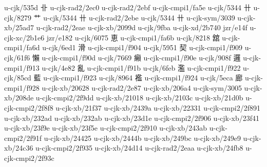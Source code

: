 \begin{multicols}{2}
u-cjk/535d	{\cjk{}卝}	u-cjk-rad2/2ec0	{} 
u-cjk-rad2/2ebf	{	}u-cjk-cmpi1/fa5e	{} 
u-cjk/5344	{\cjk{}卄}	u-cjk/8279	{\cjk{}艹} 
u-cjk/5344	{\cjk{}卄}	u-cjk-rad2/2ebe	{} 
u-cjk/5344	{\cjk{}卄}	u-cjk-sym/3039	{} 
u-cjk-xb/25ad7	{\cjk{}}	u-cjk-rad2/2eae	{} 
u-cjk-xb/2099d	{	}u-cjk/9fba	{\cjk{}} 
u-cjk-xd/2b740	{	}jzr/e14f	{} 
u-cjk-xc/2b1e6	{	}jzr/e182	{} 
u-cjk/6075	{\cjk{}恵}	u-cjk-cmpi1/fa6b	{} 
u-cjk/8218	{\cjk{}舘}	u-cjk-cmpi1/fa6d	{} 
u-cjk/6ed1	{\cjk{}滑}	u-cjk-cmpi1/f904	{} 
u-cjk/5951	{\cjk{}契}	u-cjk-cmpi1/f909	{} 
u-cjk/61f6	{\cjk{}懶}	u-cjk-cmpi1/f90d	{} 
u-cjk/7669	{\cjk{}癩}	u-cjk-cmpi1/f90e	{} 
u-cjk/908f	{\cjk{}邏}	u-cjk-cmpi1/f913	{} 
u-cjk/4e82	{\cjk{}亂}	u-cjk-cmpi1/f91b	{} 
u-cjk/6feb	{\cjk{}濫}	u-cjk-cmpi1/f922	{} 
u-cjk/85cd	{\cjk{}藍}	u-cjk-cmpi1/f923	{} 
u-cjk/8964	{\cjk{}襤}	u-cjk-cmpi1/f924	{} 
u-cjk/5eca	{\cjk{}廊}	u-cjk-cmpi1/f928	{} 
u-cjk-xb/20628	{	}u-cjk-rad2/2e87	{} 
u-cjk-xb/206a4	{	}u-cjk-sym/3005	{} 
u-cjk-xb/208de	{	}u-cjk-cmpi2/2f9dd	{} 
u-cjk-xb/21018	{	}u-cjk-xb/2103c	{} 
u-cjk-xb/21d0b	{	}u-cjk-cmpi2/2f8f8	{} 
u-cjk-xb/21f37	{	}u-cjk-xb/2439a	{} 
u-cjk-xb/22331	{	}u-cjk-cmpi2/2f891	{} 
u-cjk-xb/232ad	{	}u-cjk-xb/232ab	{} 
u-cjk-xb/23d1e	{	}u-cjk-cmpi2/2f906	{} 
u-cjk-xb/23f41	{	}u-cjk-xb/23f9e	{} 
u-cjk-xb/23f5e	{	}u-cjk-cmpi2/2f910	{} 
u-cjk-xb/243ab	{	}u-cjk-cmpi2/2f91f	{} 
u-cjk-xb/24425	{	}u-cjk-xb/2444b	{} 
u-cjk-xb/249bc	{	}u-cjk-xb/249e9	{} 
u-cjk-xb/24c36	{	}u-cjk-cmpi2/2f935	{} 
u-cjk-xb/24d14	{\cjk{}}	u-cjk-rad2/2eaa	{} 
u-cjk-xb/24fb8	{	}u-cjk-cmpi2/2f93c	{} 

\end{multicols}
